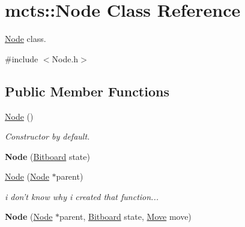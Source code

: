 \hypertarget{classmcts_1_1_node}{\section{mcts\+:\+:Node Class Reference}
\label{classmcts_1_1_node}
}


\hyperlink{classmcts_1_1_node}{Node} class.  




{\ttfamily \#include $<$Node.\+h$>$}

\subsection*{Public Member Functions}
\begin{DoxyCompactItemize}
\item 
\hypertarget{classmcts_1_1_node_a5fb90d28e126f4e432b2cc3721bd357a}{\hyperlink{classmcts_1_1_node_a5fb90d28e126f4e432b2cc3721bd357a}{Node} ()}\label{classmcts_1_1_node_a5fb90d28e126f4e432b2cc3721bd357a}

\begin{DoxyCompactList}\small\item\em Constructor by default. \end{DoxyCompactList}\item 
\hypertarget{classmcts_1_1_node_ac23152a7993365712024e8a7565c4301}{{\bfseries Node} (\hyperlink{class_bitboard}{Bitboard} state)}\label{classmcts_1_1_node_ac23152a7993365712024e8a7565c4301}

\item 
\hyperlink{classmcts_1_1_node_ac5c6318435fbc51f472c9edf2866dd11}{Node} (\hyperlink{classmcts_1_1_node}{Node} $\ast$parent)
\begin{DoxyCompactList}\small\item\em i don't know why i created that function... \end{DoxyCompactList}\item 
\hypertarget{classmcts_1_1_node_a0725206cf1e3806a1570c0c0f4825c18}{{\bfseries Node} (\hyperlink{classmcts_1_1_node}{Node} $\ast$parent, \hyperlink{class_bitboard}{Bitboard} state, \hyperlink{class_move}{Move} move)}\label{classmcts_1_1_node_a0725206cf1e3806a1570c0c0f4825c18}


\end{DoxyCompactItemize}

